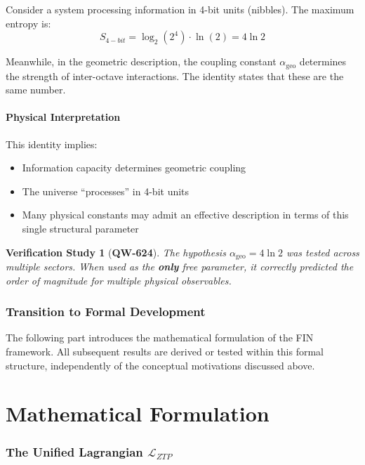 \documentclass[11pt,a4paper]{book}
\newtheorem{verification}{Verification Study}[section]
\theoremstyle{remark}
\newcommand{\Lagr}{\mathcal{L}}
\newcommand{\alphageo}{\alpha_{\text{geo}}}
\newcommand{\QW}[1]{\textbf{QW-#1}}
\begin{document}
Consider a system processing information in 4-bit units (nibbles). The maximum entropy is:
\begin{equation}
S_{4-bit} = \log_2(2^4) \cdot \ln(2) = 4 \ln 2
\end{equation}

Meanwhile, in the geometric description, the coupling constant $\alphageo$ determines the strength of inter-octave interactions. The identity states that these are the same number.

\subsection{Physical Interpretation}

This identity implies:
\begin{itemize}
    \item Information capacity determines geometric coupling
    \item The universe ``processes'' in 4-bit units
    \item Many physical constants may admit an effective description in terms of this single structural parameter
\end{itemize}

\begin{verification}[\QW{624}]
The hypothesis $\alphageo = 4 \ln 2$ was tested across multiple sectors. When used as the \textbf{only} free parameter, it correctly predicted the order of magnitude for multiple physical observables.
\end{verification}

\section*{Transition to Formal Development}

The following part introduces the mathematical formulation of the FIN framework. All subsequent results are derived or tested within this formal structure, independently of the conceptual motivations discussed above.

\newpage
\part{Mathematical Formulation}

\section{The Unified Lagrangian $\Lagr_{ZTP}$}
\end{document}

